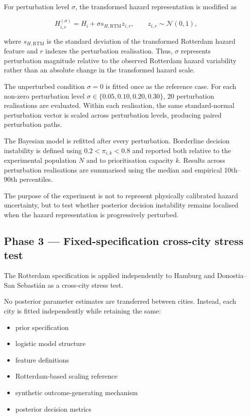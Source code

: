 \documentclass[
]{article}
\providecommand{\tightlist}{%
  \setlength{\itemsep}{0pt}\setlength{\parskip}{0pt}}
\begin{document}
For perturbation level \(\sigma\), the transformed hazard representation
is modified as

\[
H_{i,r}^{(\sigma)}
=
H_i
+
\sigma s_{H,\mathrm{RTM}} z_{i,r},
\qquad
z_{i,r}\sim\mathcal{N}(0,1),
\]

where \(s_{H,\mathrm{RTM}}\) is the standard deviation of the
transformed Rotterdam hazard feature and \(r\) indexes the perturbation
realisation. Thus, \(\sigma\) represents perturbation magnitude relative
to the observed Rotterdam hazard variability rather than an absolute
change in the transformed hazard scale.

The unperturbed condition \(\sigma=0\) is fitted once as the reference
case. For each non-zero perturbation level
\(\sigma\in\{0.05,0.10,0.20,0.30\}\), 20 perturbation realisations are
evaluated. Within each realisation, the same standard-normal
perturbation vector is scaled across perturbation levels, producing
paired perturbation paths.

The Bayesian model is refitted after every perturbation. Borderline
decision instability is defined using \(0.2 < \pi_{i,k} < 0.8\) and
reported both relative to the experimental population \(N\) and to
prioritisation capacity \(k\). Results across perturbation realisations
are summarised using the median and empirical 10th--90th percentiles.

The purpose of the experiment is not to represent physically calibrated
hazard uncertainty, but to test whether posterior decision instability
remains localised when the hazard representation is progressively
perturbed.

\subsection{Phase 3 --- Fixed-specification cross-city stress
test}\label{phase-3-fixed-specification-cross-city-stress-test}

The Rotterdam specification is applied independently to Hamburg and
Donostia--San Sebastián as a cross-city stress test.

No posterior parameter estimates are transferred between cities.
Instead, each city is fitted independently while retaining the same:

\begin{itemize}
\tightlist
\item
  prior specification
\item
  logistic model structure
\item
  feature definitions
\item
  Rotterdam-based scaling reference
\item
  synthetic outcome-generating mechanism
\item
  posterior decision metrics
\end{itemize}
\end{document}
